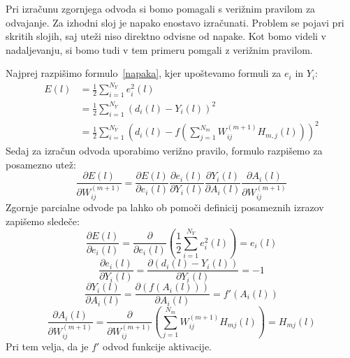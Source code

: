 \documentclass[mat1]{fmfdelo}
\begin{document}
Pri izračunu zgornjega odvoda si bomo pomagali s verižnim pravilom za odvajanje. Za izhodni sloj je napako enostavo izračunati. Problem se pojavi pri skritih slojih, saj uteži niso direktno odvisne od napake. Kot bomo videli v nadaljevanju, si bomo tudi v tem primeru pomgali z verižnim pravilom. 

Najprej razpišimo formulo~\eqref{napaka}, kjer upoštevamo formuli za $e_i$ in $Y_i$:
\begin{equation*}
\begin{aligned}
E(l) &= \frac{1}{2}\sum^{N_Y}_{i=1}e_i^2(l) \\
&=\frac{1}{2}\sum^{N_Y}_{i=1}{\left(d_i(l) - Y_i(l)\right)}^2 \\
&= \frac{1}{2}\sum^{N_Y}_{i=1}\left(d_i(l)-f\left(\sum^{N_m}_{j=1}W^{(m+1)}_{ij}H_{m,j}(l)\right)\right)^2
\end{aligned}
\end{equation*}
%
 Sedaj za izračun odvoda uporabimo verižno pravilo,  formulo razpišemo za posamezno utež:
%
\begin{equation}
\frac{\partial E(l)}{\partial W^{(m+1)}_{ij}} = \frac{\partial E(l)}{\partial e_i(l)}
\frac{\partial e_i(l)}{\partial Y_i(l)} 
\frac{\partial Y_i(l)}{\partial A_i(l)}
\frac{\partial A_i(l)}{\partial W^{(m+1)}_{ij}}
\end{equation}
%
Zgornje parcialne odvode pa lahko ob pomoči definicij posameznih izrazov zapišemo sledeče:
%
\begin{equation}
\frac{\partial E(l)}{\partial e_i(l)} = \frac{\partial}{\partial e_i(l)}\left(\frac{1}{2}\sum^{N_Y}_{i=1}e_i^2(l)\right)=e_i(l)
\end{equation}
%
\begin{equation}
\frac{\partial e_i(l)}{\partial Y_i(l)}= \frac{\partial (d_i(l) - Y_i(l))}{\partial Y_i(l)} = -1
\end{equation}
%
\begin{equation}
\frac{\partial Y_i(l)}{\partial A_i(l)} = \frac{\partial (f(A_i(l))) }{\partial A_i(l)} =f'(A_i(l))
\end{equation}
%
\begin{equation}
\frac{\partial A_i(l)}{\partial W^{(m+1)}_{ij}} =\frac{\partial}{\partial W^{(m+1)}_{ij}} \left(\sum^{N_m}_{j=1}W_{ij}^{(m+1)}H_{mj}(l)\right) = H_{mj}(l)
\end{equation}
%
Pri tem velja, da je $f'$ odvod funkcije aktivacije. 
\end{document}
